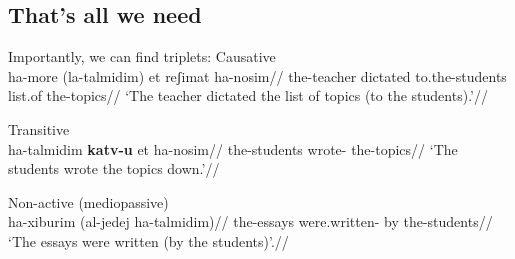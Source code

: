 \newpage
	\subsection{That's all we need}
\pex Importantly, we can find triplets:
	\a Causative {\thif}\\
		\begingl
		\gla ha-more  (la-talmidim) et reʃimat ha-nosim//
		\glb the-teacher dictated to.the-students  list.of the-topics//
		\glft `The teacher dictated the list of topics (to the students).'//
	\endgl
	
	\a Transitive {\tkal}\\
		\begingl
		\gla ha-talmidim \textbf{katv-u} et ha-nosim//
		\glb the-students wrote-  the-topics//
		\glft `The students wrote the topics down.'//
	\endgl
	
	\a Non-active (mediopassive) {\tnif}\\
		\begingl
		\gla ha-xiburim  (al-jedej ha-talmidim)//
		\glb the-essays were.written- by the-students//
		\glft `The essays were written (by the students)'.//
	\endgl
\xe


